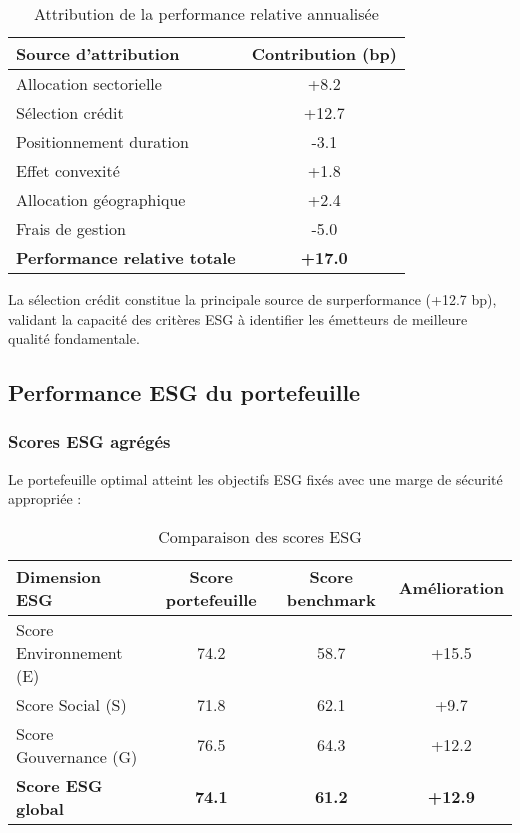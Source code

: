 \begin{table}[h!]
\centering
\begin{tabular}{lc}
\hline
\textbf{Source d'attribution} & \textbf{Contribution (bp)} \\
\hline
Allocation sectorielle & +8.2 \\
Sélection crédit & +12.7 \\
Positionnement duration & -3.1 \\
Effet convexité & +1.8 \\
Allocation géographique & +2.4 \\
Frais de gestion & -5.0 \\
\hline
\textbf{Performance relative totale} & \textbf{+17.0} \\
\hline
\end{tabular}
\caption{Attribution de la performance relative annualisée}
\end{table}

La sélection crédit constitue la principale source de surperformance (+12.7 bp), validant la capacité des critères ESG à identifier les émetteurs de meilleure qualité fondamentale.

\subsection{Performance ESG du portefeuille}

\subsubsection{Scores ESG agrégés}

Le portefeuille optimal atteint les objectifs ESG fixés avec une marge de sécurité appropriée :

\begin{table}[h!]
\centering
\begin{tabular}{lccc}
\hline
\textbf{Dimension ESG} & \textbf{Score portefeuille} & \textbf{Score benchmark} & \textbf{Amélioration} \\
\hline
Score Environnement (E) & 74.2 & 58.7 & +15.5 \\
Score Social (S) & 71.8 & 62.1 & +9.7 \\
Score Gouvernance (G) & 76.5 & 64.3 & +12.2 \\
\hline
\textbf{Score ESG global} & \textbf{74.1} & \textbf{61.2} & \textbf{+12.9} \\
\hline
\end{tabular}
\caption{Comparaison des scores ESG}
\end{table}

